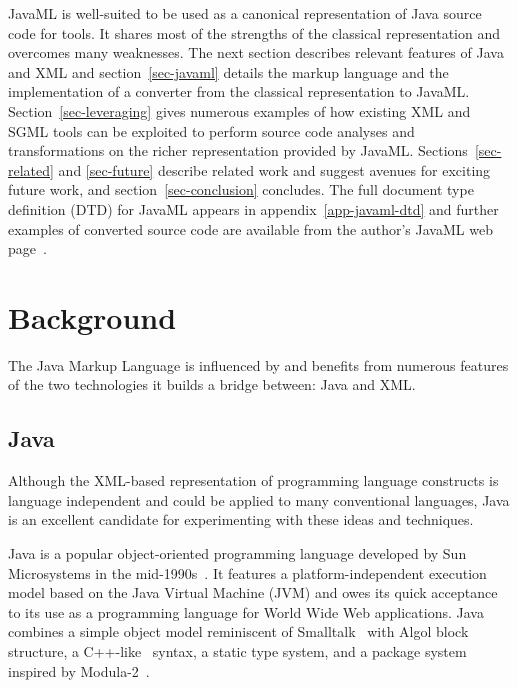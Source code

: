 \documentclass{article}
\begin{document}
\begin{multicols}{2}
JavaML is well-suited to be used as a canonical representation of Java
source code for tools.  It shares most of the strengths of the classical
representation and overcomes many weaknesses.  The next section
describes relevant features of Java and XML and section~\ref{sec-javaml}
details the markup language and the implementation of a converter from
the classical representation to JavaML.  Section~\ref{sec-leveraging}
gives numerous examples of how existing XML and SGML tools can be
exploited to perform source code analyses and transformations on the
richer representation provided by JavaML.  Sections~\ref{sec-related}
and \ref{sec-future} describe related work and suggest avenues for
exciting future work, and section~\ref{sec-conclusion} concludes.  The
full document type definition (DTD) for JavaML appears in
appendix~\ref{app-javaml-dtd} and further examples of converted source
code are available from the author's JavaML web page~\cite{Badros-javaml}.

\section{Background}
\label{sec-background}

The Java Markup Language is influenced by and benefits from numerous
features of the two technologies it builds a bridge between: Java and
XML.

\subsection{Java}
\label{ssec-java}

Although the XML-based representation of programming language constructs
is language independent and could be applied to many conventional
languages, Java is an excellent candidate for experimenting with these
ideas and techniques.

Java is a popular object-oriented programming language developed by Sun
Microsystems in the mid-1990s~\cite{Arnold98,Flanagan97}.  It features a
platform-independent execution model based on the Java Virtual Machine
(JVM) and owes its quick acceptance to its use as a programming language
for World Wide Web applications.  Java combines a simple object model
reminiscent of Smalltalk~\cite{Goldberg89} with Algol block structure, a
C++-like~\cite{Stroustrup97} syntax, a static type system, and a package system
inspired by Modula-2~\cite{Modula2}.


\end{multicols}
\end{document}

